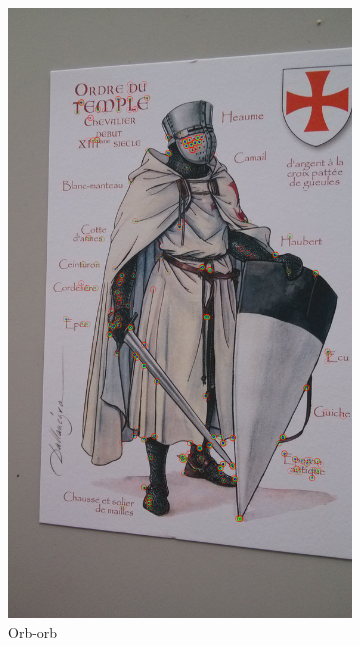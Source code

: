 \documentclass[10pt,conference,compsocconf]{IEEEtran}
\begin{document}
\begin{figure}[!ht]
\begin{subfigure}[b]{0.15\textwidth}
                \includegraphics[width=\textwidth]{o}
                \caption{Orb-orb}
                \label{fig:o}
        \end{subfigure}
        ~ %
        \begin{subfigure}[b]{0.15\textwidth}

\end{subfigure}
\end{figure}
\end{document}
